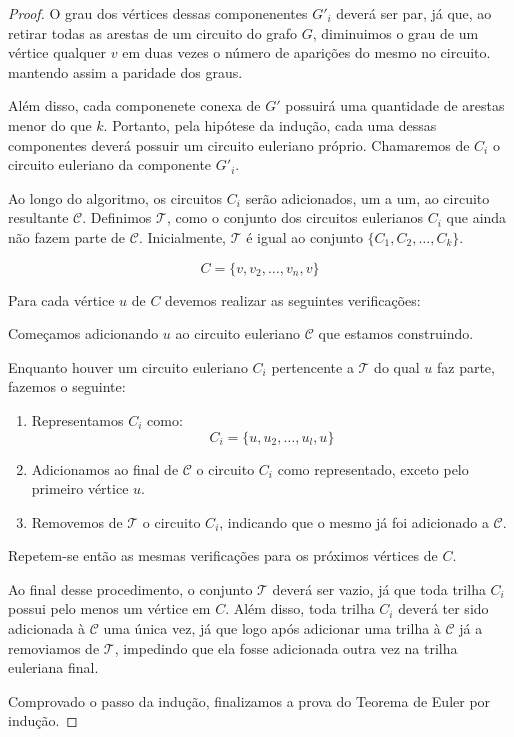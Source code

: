 \documentclass[12pt, a4paper]{article}
\begin{document}
\begin{proof}
O grau dos vértices dessas componenentes $G'_i$ deverá ser par, já que, ao retirar todas as arestas de um circuito do grafo $G$, diminuimos o grau de um vértice qualquer $v$ em duas vezes o número de aparições do mesmo no circuito. mantendo assim a paridade dos graus. 

Além disso, cada componenete conexa de $G'$ possuirá uma quantidade de arestas menor do que $k$.
Portanto, pela hipótese da indução, cada uma dessas componentes deverá possuir um circuito euleriano próprio. 
Chamaremos de $C_i$ o circuito euleriano da componente $G'_i$.

Ao longo do algoritmo, os circuitos $C_i$ serão adicionados, um a um, ao circuito resultante $\mathcal{C}$. 
Definimos $\mathcal{T}$, como o conjunto dos circuitos eulerianos $C_i$ que ainda não fazem parte de $\mathcal{C}$. 
Inicialmente, $\mathcal{T}$ é igual ao conjunto $\{C_1, C_2, \dots, C_k\}$.


\[
	C = \{v, v_2, \dots, v_n, v\}
\]

Para cada vértice $u$ de $C$ devemos realizar as seguintes verificações:

\begin{tcolorbox}

Começamos adicionando $u$ ao circuito euleriano $\mathcal{C}$ que estamos construindo.

Enquanto houver um circuito euleriano $C_i$ pertencente a $\mathcal{T}$ do qual $u$ faz parte, fazemos o seguinte:


\begin{enumerate}
    \item Representamos $C_i$ como: 
    \[
        C_i = \{u, u_2, \dots, u_l, u\}
    \]

\item Adicionamos ao final de $\mathcal{C}$ o circuito $C_i$ como representado, exceto pelo primeiro vértice $u$. 

\item Removemos de $\mathcal{T}$ o circuito $C_i$, indicando que o mesmo já foi adicionado a $\mathcal{C}$.

\end{enumerate}

Repetem-se então as mesmas verificações para os próximos vértices de $C$.
\end{tcolorbox}


Ao final desse procedimento, o conjunto $\mathcal{T}$ deverá ser vazio, já que toda trilha $C_i$ possui pelo menos um vértice em $C$. Além disso, toda trilha $C_i$ deverá ter sido adicionada à $\mathcal{C}$ uma única vez, já que logo após adicionar uma trilha à $\mathcal{C}$ já a removiamos de $\mathcal{T}$, impedindo que ela fosse adicionada outra vez na trilha euleriana final.

Comprovado o passo da indução, finalizamos a prova do Teorema de Euler por indução.

\end{proof}
\end{document}
